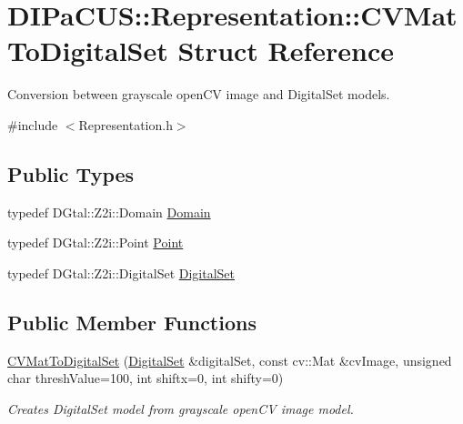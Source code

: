 \hypertarget{structDIPaCUS_1_1Representation_1_1CVMatToDigitalSet}{}\section{D\+I\+Pa\+C\+US\+:\+:Representation\+:\+:C\+V\+Mat\+To\+Digital\+Set Struct Reference}
\label{structDIPaCUS_1_1Representation_1_1CVMatToDigitalSet}


Conversion between grayscale open\+CV image and Digital\+Set models.  




{\ttfamily \#include $<$Representation.\+h$>$}

\subsection*{Public Types}
\begin{DoxyCompactItemize}
\item 
typedef D\+Gtal\+::\+Z2i\+::\+Domain \mbox{\hyperlink{structDIPaCUS_1_1Representation_1_1CVMatToDigitalSet_a105fa216170e3f3a3722444b0cb7e71b}{Domain}}
\item 
typedef D\+Gtal\+::\+Z2i\+::\+Point \mbox{\hyperlink{structDIPaCUS_1_1Representation_1_1CVMatToDigitalSet_adad5bdd19c3c97ae7b6aad32211a2430}{Point}}
\item 
typedef D\+Gtal\+::\+Z2i\+::\+Digital\+Set \mbox{\hyperlink{structDIPaCUS_1_1Representation_1_1CVMatToDigitalSet_ab7e5df61bd4397642ff888bcca66a4dc}{Digital\+Set}}
\end{DoxyCompactItemize}
\subsection*{Public Member Functions}
\begin{DoxyCompactItemize}
\item 
\mbox{\hyperlink{structDIPaCUS_1_1Representation_1_1CVMatToDigitalSet_aadf01ae92c99a92ff218ee73b4086a5b}{C\+V\+Mat\+To\+Digital\+Set}} (\mbox{\hyperlink{structDIPaCUS_1_1Representation_1_1CVMatToDigitalSet_ab7e5df61bd4397642ff888bcca66a4dc}{Digital\+Set}} \&digital\+Set, const cv\+::\+Mat \&cv\+Image, unsigned char thresh\+Value=100, int shiftx=0, int shifty=0)
\begin{DoxyCompactList}\small\item\em Creates Digital\+Set model from grayscale open\+CV image model. \end{DoxyCompactList}\end{DoxyCompactItemize}


